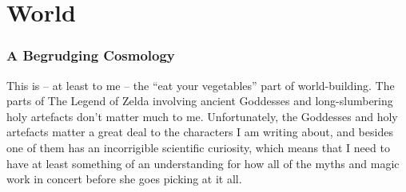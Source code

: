 \documentclass[../FGP.tex]{subfiles}
\begin{document}
% 
\part{World}
\section{A Begrudging Cosmology}
This is -- at least to me -- the ``eat your vegetables'' part of world-building. The parts of The Legend of Zelda involving ancient Goddesses and long-slumbering holy artefacts don't matter much to me. Unfortunately, the Goddesses and holy artefacts matter a great deal to the characters I am writing about, and besides one of them has an incorrigible scientific curiosity,%
which means that I need to have at least something of an understanding for how all of the myths and magic work in concert before she goes picking at it all.
\end{document}
